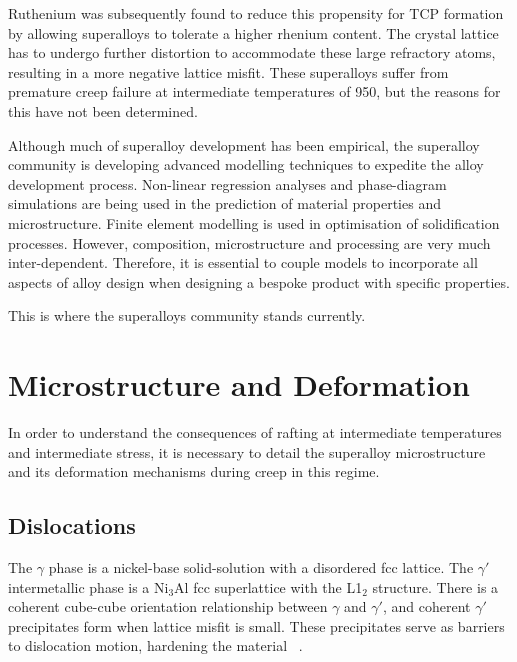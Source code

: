 Ruthenium was subsequently found to reduce this propensity for TCP formation by allowing superalloys to tolerate a higher rhenium content.  The crystal lattice has to undergo further distortion to accommodate these large refractory atoms, resulting in a more negative lattice misfit.  These superalloys suffer from premature creep failure at intermediate temperatures of 950\celsius, but the reasons for this have not been determined.

Although much of superalloy development has been empirical, the superalloy community is developing advanced modelling techniques to expedite the alloy development process.  Non-linear regression analyses and phase-diagram simulations are being used in the prediction of material properties and microstructure.  Finite element modelling is used in optimisation of solidification processes.  However, composition, microstructure and processing are very much inter-dependent.  Therefore, it is essential to couple models to incorporate all aspects of alloy design when designing a bespoke product with specific properties.

This is where the superalloys community stands currently.

\section{Microstructure and Deformation}

In order to understand the consequences of rafting at intermediate temperatures and intermediate stress, it is necessary to detail the superalloy microstructure and its deformation mechanisms during creep in this regime.

\subsection{Dislocations}

The $\gamma$ phase is a nickel-base solid-solution with a disordered fcc lattice.  The $\gamma'$ intermetallic phase is a Ni$_3$Al fcc superlattice with the L1$_2$ structure.  There is a coherent cube-cube orientation  relationship between $\gamma$ and $\gamma'$, and coherent $\gamma'$ precipitates form when lattice misfit is small.  These precipitates serve as barriers to dislocation motion, hardening the material ~\cite{copley67}. 


